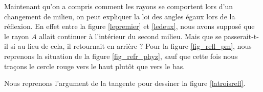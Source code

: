 Maintenant qu'on a compris comment les rayons se comportent lors d'un changement de milieu, on peut expliquer la loi des angles égaux lors de la réflexion. En effet entre la figure \ref{lepremier} et \ref{ledeux}, nous avons supposé que le rayon $A$ allait continuer à l'intérieur du second milieu. Mais que se passerait-t-il si au lieu de cela, il retournait en arrière ? Pour la figure \ref{fig_refl_pm}, nous reprenons la situation de la figure \ref{fig_refr_phyz}, sauf que cette fois nous traçons le cercle rouge vers le haut plutôt que vers le bas.

Nous reprenons l'argument de la tangente pour dessiner la figure \ref{latroisrefl}.

\begin{figure}[ht]
\centering

%
%
\end{figure}
